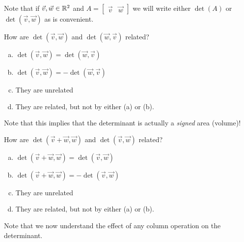 \begin{applicationActivities}{1}{26}
\begin{observation}
Note that if $\vec{v},\vec{w} \in \mathbb{R}^2$ and $A=\begin{bmatrix} \vec{v} & \vec{w}\end{bmatrix}$ we will write either $\det(A)$ or $\det(\vec{v},\vec{w})$ as is convenient.
\end{observation}

\begin{activity}{0}
\item How are $\det (\vec{v},\vec{w})$ and $\det(\vec{w},\vec{v})$ related?
\begin{enumerate}[(a)]
\item $\det(\vec{v},\vec{w}) = \det(\vec{w},\vec{v})$
\item $\det(\vec{v},\vec{w}) = -\det(\vec{w},\vec{v})$
\item They are unrelated
\item They are related, but not by either (a) or (b).
\end{enumerate}
\end{activity}


\begin{observation}
Note that this implies that the determinant is actually a \textit{signed} area (volume)!
\end{observation}

\begin{activity}{0}
\item How are $\det (\vec{v}+\vec{w},\vec{w})$ and $\det(\vec{v},\vec{w})$ related?
\begin{enumerate}[(a)]
\item $\det(\vec{v}+\vec{w},\vec{w}) = \det(\vec{v},\vec{w})$
\item $\det(\vec{v}+\vec{w},\vec{w}) = -\det(\vec{v},\vec{w})$
\item They are unrelated
\item They are related, but not by either (a) or (b).
\end{enumerate}
\end{activity}

\begin{observation}
  Note that we now understand the effect of any column operation on the determinant.
\end{observation}


\end{applicationActivities}
